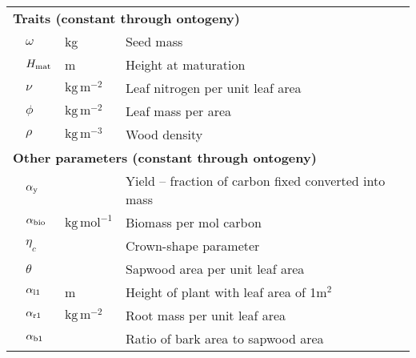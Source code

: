 \documentclass[a4paper,11pt]{article}
\begin{document}
\begin{table}[ht]
{\begin{tabular}{p{0.1cm}p{2cm}p{2.5cm}p{8cm}}
\multicolumn{4}{l}{\textbf{Traits (constant through ontogeny)}} \\
& $\omega$ & kg & Seed mass  \\
& $H_{{\rm mat}}$ & m & Height at maturation\\
& $\nu$ & $\mathrm{kg}\,\mathrm{m}^{-2}$ & Leaf nitrogen per unit leaf area  \\
& $\phi$ & $\mathrm{kg}\,\mathrm{m}^{-2}$ & Leaf mass per area \\
& $\rho$ & $\mathrm{kg}\,\mathrm{m}^{-3}$ & Wood density \\
\multicolumn{4}{l}{\textbf{Other parameters (constant through ontogeny)}} \\
& $\alpha_{\rm y}$ &  & Yield -- fraction of carbon fixed converted into mass\\
& $\alpha_{\rm bio}$  & $\mathrm{kg}\,\mathrm{mol}^{-1}$ & Biomass per mol carbon \\
& $\eta_c$ & & Crown-shape parameter\\
& $\theta$ &  & Sapwood area per unit leaf area\\
& $\alpha_{\rm l1}$ & m & Height of plant with leaf area of 1m$^2$ \\
& $\alpha_{\rm r1}$ & $\mathrm{kg}\,\mathrm{m}^{-2}$ & Root mass per unit leaf area \\
& $\alpha_{\rm b1}$ &  & Ratio of bark area to sapwood area\\
\hline
\end{tabular}
}
\label{tab:definitions}
\end{table}



\newpage
\end{document}
